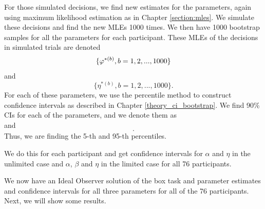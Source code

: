 For those simulated decisions, we find new estimates for the parameters, again using maximum likelihood estimation as in Chapter \ref{section:mles}. We simulate these decisions and find the new MLEs 1000 times. We then have 1000 bootstrap samples for all the parameters for each participant. These MLEs of the decisions in simulated trials are denoted
\begin{equation*}
    \{\varphi^{*(b)}, b=1,2,...,1000 \}
\end{equation*}
and 
\begin{equation*}
    \{\eta^{*(b)}, b=1,2,...,1000 \}.
\end{equation*}
For each of these parameters, we use the percentile method to construct confidence intervals as described in Chapter \ref{theory_ci_bootstrap}. We find 90\% CIs for each of the parameters, and we denote them as
\begin{equation*}
    [\hat{\vp}^{*(5)}_{1000},\hat{\vp}^{*(95)}_{1000}]
\end{equation*}
and
\begin{equation*}
    [\hat{\eta}^{*(5)}_{1000},\hat{\eta}^{*(95)}_{1000}].
\end{equation*}
Thus, we are finding the 5-th and 95-th percentiles. 

We do this for each participant and get confidence intervals for $\alpha$ and $\eta$ in the unlimited case and $\alpha$, $\beta$ and $\eta$ in the limited case for all 76 participants. 

We now have an Ideal Observer solution of the box task and parameter estimates and confidence intervals for all three parameters for all of the 76 participants. Next, we will show some results.